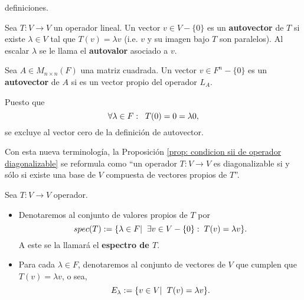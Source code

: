 definiciones.
\begin{defi}
	\label{def: vector y valor propio}
	Sea $T: V \longrightarrow V$ un operador lineal.	
	Un vector $v \in V - \{ 0 \}$ es un \textbf{autovector} de 
	$T$ si existe $\lambda \in V$ tal que 
	$T(v) = \lambda v$ (i.e. $v$ y su imagen bajo $T$ son paralelos).
	Al escalar $\lambda$ se le llama el \textbf{autovalor} 
	asociado a $v$.
	
	Sea $A \in M_{n \times n}(F)$ una matriz cuadrada. Un 
	vector $v \in F^{n} - \{ 0 \}$ es un \textbf{autovector}
	de $A$ si es un vector propio del operador $L_{A}$.
\end{defi}

Puesto que 
\[
\forall \lambda \in F: \hspace{0.2cm}
T(0) = 0 = \lambda 0,
\]
se excluye al vector cero de la definición de autovector.


Con esta nueva terminología, la Proposición 
\ref{prop: condicion sii de operador diagonalizable} se reformula
como ``un operador $T:V \longrightarrow V$ es diagonalizable si y sólo si
existe una base de $V$ compuesta de vectores propios de $T$''.


\begin{defi}
	\label{def: espectro de operador y espacios E lambda}
Sea $T: V \longrightarrow V$ operador.
\begin{itemize}
	\item Denotaremos al conjunto de valores propios de $T$ por
	\begin{equation}
	\label{eq: espectro de T}
		spec(T) := \{ \lambda \in F  | \hspace{0.2cm}  
		\exists v \in V-\{ 0 \}: \hspace{0.1cm} T(v) = \lambda v
		\}.
	\end{equation}
	A este se la llamará el \textbf{espectro de $T$}.
	\item Para cada $\lambda \in F$, denotaremos
	al conjunto de vectores de $V$ que cumplen que 
	$T(v) = \lambda v$, o sea,
	\begin{equation}
		\label{eq: espacios de vect propios de T}
		E_{\lambda} := \{ v \in V  | \hspace{0.2cm} T(v) = \lambda v \}.
	\end{equation}
\end{itemize}
\end{defi}

